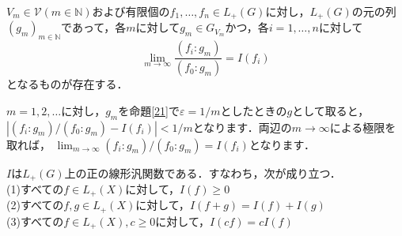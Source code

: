 \begin{ycor}\label{22}
$V_m \in \mathscr{V}(m \in \mathbb{N})$および有限個の$f_1, \ldots , f_n \in L_{+}(G)$に対し，$L_{+}(G)$の元の列$(g_m)_{m \in \mathbb{N}}$であって，各$m$に対して$g_m \in G_{V_m}$かつ，各$i=1, \ldots , n$に対して 
\[
\lim_{m \to \infty} \frac{(f_i \colon g_m )}{( f_0 \colon g_m )} =I(f_i)
\]
となるものが存在する．
\end{ycor}
\begin{Proof}
$m=1,2, \ldots$に対し，$g_m$を命題\ref{21}で$\varepsilon = 1/m$としたときの$g$として取ると，$|(f_i \colon g_m ) / ( f_0 \colon g_m ) -I(f_i) | < 1/m$となります．両辺の$m \to \infty$による極限を取れば， $\lim_{m \to \infty} (f_i \colon g_m ) / ( f_0 \colon g_m ) =I(f_i)$となります．　
\end{Proof}

\begin{yprop}\label{23}
$I$は$L_{+}(G)$上の正の線形汎関数である．すなわち，次が成り立つ． \\
(1)すべての$f \in L_{+}(X)$に対して，$I(f) \ge 0$\\
(2)すべての$f,g \in L_{+}(X)$に対して，$I(f+g)=I(f)+I(g)$\\
(3)すべての$f \in L_{+}(X), c \ge 0$に対して，$I(cf)=cI(f)$
\end{yprop}
